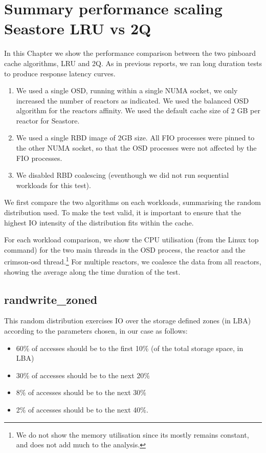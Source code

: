 \chapter{Summary performance scaling Seastore LRU vs 2Q}

In this Chapter we show the performance comparison between the two pinboard
cache algorithms, LRU and 2Q. As in previous reports, we ran long duration
tests to produce response latency curves. 

\begin{enumerate}
  \item We used a single OSD, running within a single NUMA socket, we only
    increased the number of reactors as indicated. We used the balanced OSD
    algorithm for the reactors affinity. We used the default cache size of 2 GB
    per reactor for Seastore.
  \item We used a single RBD image of 2GB size. All FIO processes were pinned
  to the other NUMA socket, so that the OSD processes were not affected by the
FIO processes. \item We disabled RBD coalescing (eventhough we did not run
  sequential workloads for this test).
\end{enumerate}

We first compare the two algorithms on each workloads, summarising the random
distribution used. To make the test valid, it is important to ensure that the
highest IO intensity of the distribution fits within the cache.

For each workload comparison, we show the CPU utilisation (from the Linux top
command) for the two main threads in the OSD process, the reactor and the
crimson-osd thread.\footnote{We do not show the memory utilisation since its
mostly remains constant, and does not add much to the analysis.} For multiple
reactors, we coalesce the data from all reactors, showing the average along the
time duration of the test.

\pagebreak
\section{randwrite\_zoned}

This random distribution exercises IO over the storage defined zones (in LBA)
according to the parameters chosen, in our case as follows:

\begin{itemize}
  \item 60\% of accesses should be to the first 10\%  (of the total storage space, in LBA)
\item 30\% of accesses should be to the next 20\%
\item 8\% of accesses should be to the next 30\%
\item 2\% of accesses should be to the next 40\%.
\end{itemize}

